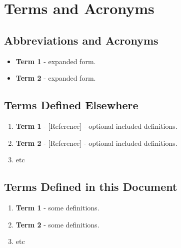\clearpage
\section{Terms and Acronyms}

\subsection{Abbreviations and Acronyms}
\OTTAbbreviationsAndAcronyms
\begin{itemize}
  \item\textbf{Term 1} - expanded form.
  \item\textbf{Term 2} - expanded form.
\end{itemize}

\subsection{Terms Defined Elsewhere}
\OTTTermsDefinedElsewhere
\begin{enumerate}
  \item\textbf{Term 1} - [Reference] - optional included definitions.
  \item\textbf{Term 2} - [Reference] - optional included definitions.
  \item etc
\end{enumerate}

\subsection{Terms Defined in this Document}
\OTTTermsDefinedInThisDocument
\begin{enumerate}
  \item\textbf{Term 1} - some definitions.
  \item\textbf{Term 2} - some definitions.
  \item etc
\end{enumerate}

\cite{RFC4648}